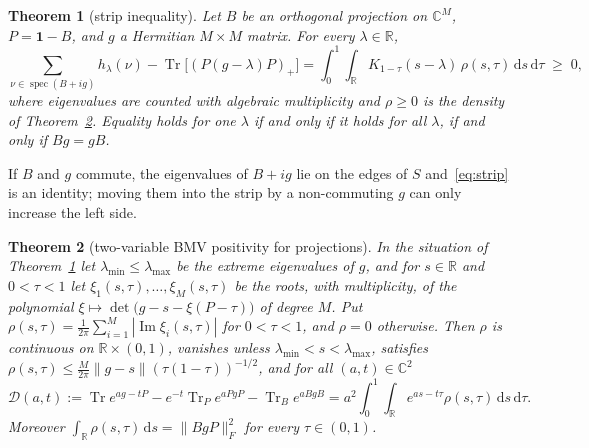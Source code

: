 \documentclass[11pt]{article}
\newtheorem{theorem}{Theorem}
\theoremstyle{remark}
\numberwithin{equation}{section}
\newcommand{\R}{\mathbb{R}}
\newcommand{\C}{\mathbb{C}}
\newcommand{\Tr}{\operatorname{Tr}}
\newcommand{\spec}{\operatorname{spec}}
\renewcommand{\Im}{\operatorname{Im}}
\newcommand{\one}{\mathbf{1}}
\newcommand{\cD}{\mathcal{D}}
\newcommand{\lmin}{\lambda_{\min}}
\newcommand{\lmax}{\lambda_{\max}}
\newcommand{\dd}{\,\mathrm{d}}
\begin{document}
\begin{theorem}[strip inequality]\label{thm:strip}
Let $B$ be an orthogonal projection on $\C^M$, $P=\one-B$, and $g$ a Hermitian $M\times M$ matrix. For every
$\lambda\in\R$,
\begin{equation}\label{eq:strip}
\sum_{\nu\in\spec(B+ig)}h_\lambda(\nu)-\Tr\bigl[(P(g-\lambda)P)_+\bigr]
=\int_0^1\!\!\int_\R K_{1-\tau}(s-\lambda)\,\rho(s,\tau)\dd s\dd\tau\;\ge\;0,
\end{equation}
where eigenvalues are counted with algebraic multiplicity and $\rho\ge0$ is the density of Theorem~\ref{thm:bmv}.
Equality holds for one $\lambda$ if and only if it holds for all $\lambda$, if and only if $Bg=gB$.
\end{theorem}

If $B$ and $g$ commute, the eigenvalues of $B+ig$ lie on the edges of $S$ and~\eqref{eq:strip} is an identity;
moving them into the strip by a non-commuting $g$ can only increase the left side.

\begin{theorem}[two-variable BMV positivity for projections]\label{thm:bmv}
In the situation of Theorem~\ref{thm:strip} let $\lmin\le\lmax$ be the extreme eigenvalues of $g$, and for $s\in\R$ and
$0<\tau<1$ let $\xi_1(s,\tau),\dots,\xi_M(s,\tau)$ be the roots, with multiplicity, of the polynomial
$\xi\mapsto\det\bigl(g-s-\xi(P-\tau)\bigr)$ of degree $M$. Put $\rho(s,\tau)=\frac1{2\pi}\sum_{i=1}^M|\Im\xi_i(s,\tau)|$
for $0<\tau<1$, and $\rho=0$ otherwise. Then $\rho$ is continuous on $\R\times(0,1)$, vanishes unless $\lmin<s<\lmax$,
satisfies $\rho(s,\tau)\le\frac M{2\pi}\|g-s\|(\tau(1-\tau))^{-1/2}$, and for all $(a,t)\in\C^2$
\begin{equation}\label{eq:bmv}
\cD(a,t):=\Tr e^{ag-tP}-e^{-t}\Tr_Pe^{aPgP}-\Tr_Be^{aBgB}=a^2\int_0^1\!\!\int_\R e^{as-t\tau}\rho(s,\tau)\dd s\dd\tau .
\end{equation}
Moreover $\int_\R\rho(s,\tau)\dd s=\|BgP\|_F^2$ for every $\tau\in(0,1)$.
\end{theorem}
\end{document}
